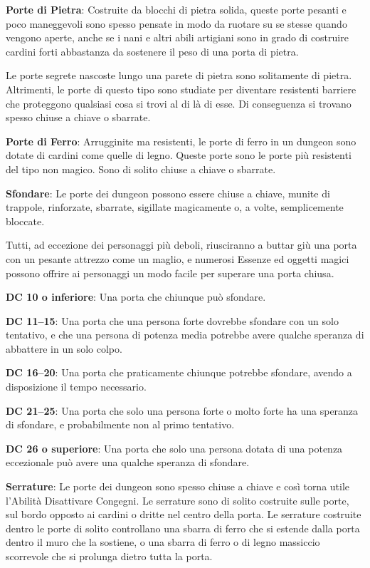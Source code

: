 \documentclass[a4paper,11pt,twoside,openany]{book}
\begin{document}
{\textbf{Porte di Pietra}: Costruite da blocchi di pietra solida, queste porte pesanti e poco maneggevoli sono spesso pensate in modo da ruotare su se stesse quando vengono aperte, anche se i nani e altri abili artigiani sono in grado di costruire cardini forti abbastanza da sostenere il peso di una porta di pietra.

Le porte segrete nascoste lungo una parete di pietra sono solitamente di pietra. Altrimenti, le porte di questo tipo sono studiate per diventare resistenti barriere che proteggono qualsiasi cosa si trovi al di là di esse. Di conseguenza si trovano spesso chiuse a chiave o sbarrate.

\textbf{Porte di Ferro}: Arrugginite ma resistenti, le porte di ferro in un dungeon sono dotate di cardini come quelle di legno. Queste porte sono le porte più resistenti del tipo non magico. Sono di solito chiuse a chiave o sbarrate.

\textbf{Sfondare}: Le porte dei dungeon possono essere chiuse a chiave, munite di trappole, rinforzate, sbarrate, sigillate magicamente o, a volte, semplicemente bloccate.

Tutti, ad eccezione dei personaggi più deboli, riusciranno a buttar giù una porta con un pesante attrezzo come un maglio, e numerosi Essenze ed oggetti magici possono offrire ai personaggi un modo facile per superare una porta chiusa.

\textbf{DC 10 o inferiore}: Una porta che chiunque può sfondare.

\textbf{DC 11--15}: Una porta che una persona forte dovrebbe sfondare con un solo tentativo, e che una persona di potenza media potrebbe avere qualche speranza di abbattere in un solo colpo.

\textbf{DC 16--20}: Una porta che praticamente chiunque potrebbe sfondare, avendo a disposizione il tempo necessario. 

\textbf{DC 21--25}: Una porta che solo una persona forte o molto forte ha una speranza di sfondare, e probabilmente non al primo tentativo. 

\textbf{DC 26 o superiore}: Una porta che solo una persona dotata di una potenza eccezionale può avere una qualche speranza di sfondare.

\textbf{Serrature}: Le porte dei dungeon sono spesso chiuse a chiave e così torna utile l'Abilità Disattivare Congegni. Le serrature sono di solito costruite sulle porte, sul bordo opposto ai cardini o dritte nel centro della porta. Le serrature costruite dentro le porte di solito controllano una sbarra di ferro che si estende dalla porta dentro il muro che la sostiene, o una sbarra di ferro o di legno massiccio scorrevole che si prolunga dietro tutta la porta. 

}
\end{document}
